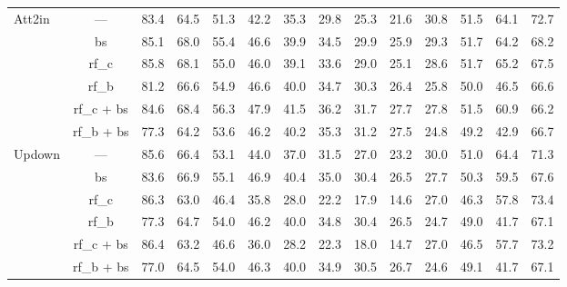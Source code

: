 \documentclass[journal,comsoc]{IEEEtran}
\begin{document}
\begin{table*}[htp]
\begin{tabular}{l|c|cccccccccccc}
\multirow{6}{*}{Att2in \cite{rennie2017self}}                    & ---     &   83.4   &   64.5   &   51.3   &   42.2   &   35.3   &   29.8   &   25.3   &   21.6   &   30.8   &   51.5   &   64.1   &   72.7   \\
                                          & bs   &  85.1   &   68.0   &   55.4   &   46.6   &   39.9   &   34.5   &   29.9   &   25.9   &   29.3   &   51.7   &   64.2   &   68.2   \\
                                          & rf\_c    &   85.8   &   68.1   &   55.0   &   46.0   &   39.1   &   33.6   &   29.0   &   25.1   &   28.6   &   51.7   &   65.2   &   67.5     \\
                                          & rf\_b     &  81.2   &   66.6   &   54.9   &   46.6   &   40.0   &   34.7   &   30.3   &   26.4   &   25.8   &   50.0   &   46.5   &   66.6  \\
                                          & rf\_c + bs   &   84.6   &   68.4   &   56.3   &   47.9   &   41.5   &   36.2   &   31.7   &   27.7   &   27.8   &   51.5   &   60.9   &   66.2   \\
                                          & rf\_b + bs   &  77.3   &   64.2   &   53.6   &   46.2   &   40.2   &   35.3   &   31.2   &   27.5   &   24.8   &   49.2   &   42.9   &   66.7   \\ \hline
\multirow{6}{*}{Updown \cite{anderson2018bottom}}                   & ---   &  85.6   &   66.4   &   53.1   &   44.0   &   37.0   &   31.5   &   27.0   &   23.2   &   30.0   &   51.0   &   64.4   &   71.3   \\
                                          & bs    &  83.6   &   66.9   &   55.1   &   46.9   &   40.4   &   35.0   &   30.4   &   26.5   &   27.7   &   50.3   &   59.5   &   67.6   \\
                                          & rf\_c     &   86.3   &   63.0   &   46.4   &   35.8   &   28.0   &   22.2   &   17.9   &   14.6   &   27.0   &   46.3   &   57.8   &   73.4    \\
                                          & rf\_b  &  77.3   &   64.7   &   54.0   &   46.2   &   40.0   &   34.8   &   30.4   &   26.5   &   24.7   &   49.0   &   41.7   &   67.1    \\
                                          & rf\_c + bs     &   86.4   &   63.2   &   46.6   &   36.0   &   28.2   &   22.3   &   18.0   &   14.7   &   27.0   &   46.5   &   57.7   &   73.2    \\
                                          & rf\_b + bs   &  77.0   &   64.5   &   54.0   &   46.3   &   40.0   &   34.9   &   30.5   &   26.7   &   24.6   &   49.1   &   41.7   &   67.1    \\ \hline

\end{tabular}
\end{table*}
\end{document}
